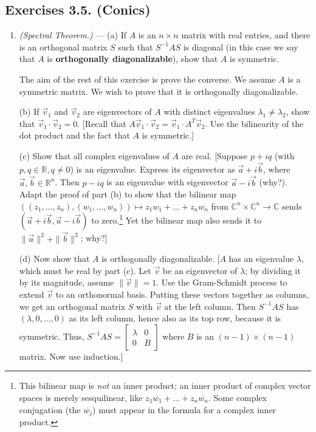 \documentclass[leqno]{book}
\begin{document}
\subsection*{Exercises 3.5. (Conics)}
\begin{enumerate}
\item\emph{(Spectral Theorem.)} \---- (a) If $A$ is an $n\times n$ matrix with real entries, and there is an orthogonal matrix $S$ such that $S^{-1}AS$ is diagonal (in this case we say that $A$ is \textbf{orthogonally diagonalizable}), show that $A$ is symmetric.

The aim of the rest of this exercise is prove the converse.  We assume $A$ is a symmetric matrix.  We wish to prove that it is orthogonally diagonalizable.

(b) If $\vec v_1$ and $\vec v_2$ are eigenvectors of $A$ with distinct eigenvalues $\lambda_1\ne\lambda_2$, show that $\vec v_1\cdot\vec v_2=0$.  [Recall that $A\vec v_1\cdot\vec v_2=\vec v_1\cdot A^T\vec v_2$.  Use the bilinearity of the dot product and the fact that $A$ is symmetric.]

(c) Show that all complex eigenvalues of $A$ are real.  [Suppose $p+iq$ (with $p,q\in\mathbb R,q\ne 0$) is an eigenvalue.  Express its eigenvector as $\vec a+i\vec b$, where $\vec a,\vec b\in\mathbb R^n$.  Then $p-iq$ is an eigenvalue with eigenvector $\vec a-i\vec b$ (why?).  Adapt the proof of part (b) to show that the bilinear map $((z_1,\dots,z_n),(w_1,\dots,w_n))\mapsto z_1w_1+\dots+z_nw_n$ from $\mathbb C^n\times\mathbb C^n\to\mathbb C$ sends $(\vec a+i\vec b,\vec a-i\vec b)$ to zero.\footnote{This bilinear map is \emph{not} an inner product; an inner product of complex vector spaces is merely sesquilinear, like $z_1\overline{w_1}+\dots+z_n\overline{w_n}$.  Some complex conjugation (the $\overline{w_j}$) must appear in the formula for a complex inner product.}  Yet the bilinear map also sends it to $\|\vec a\|^2+\|\vec b\|^2$; why?]

(d) Now show that $A$ is orthogonally diagonalizable.  [$A$ has an eigenvalue $\lambda$, which must be real by part (c).  Let $\vec v$ be an eigenvector of $\lambda$; by dividing it by its magnitude, assume $\|\vec v\|=1$.  Use the Gram-Schmidt process to extend $\vec v$ to an orthonormal basis.  Putting these vectors together as columns, we get an orthogonal matrix $S$ with $\vec v$ at the left column.  Then $S^{-1}AS$ has $(\lambda,0,\dots,0)$ as its left column, hence also as its top row, because it is symmetric.  Thus, $S^{-1}AS=\begin{bmatrix}\lambda&0\\0&B\end{bmatrix}$ where $B$ is an $(n-1)\times(n-1)$ matrix.  Now use induction.]


\end{enumerate}
\end{document}
